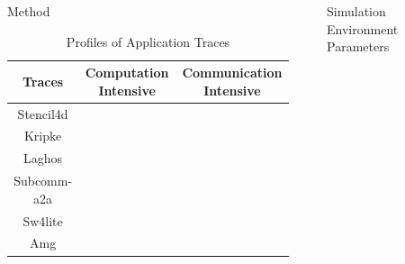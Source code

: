 \documentclass[final]{beamer}
\newcommand{\xmark}{\ding{55}}%
\newcommand{\CheckmarkBold}{\ding{51}}%
\newlength{\sepwidth}
\newcommand{\separatorcolumn}{\begin{column}{\sepwidth}\end{column}}
\begin{document}
\begin{frame}[t]
\begin{columns}[t]
\begin{column}{0.2\textwidth}
\begin{block}{Method}
\begin{itemize}
\begin{table}
        \begin{tabular}{|c|c|c|} \hline
        \hline
        \textbf{Traces} & \textbf{Computation Intensive} & \textbf{Communication Intensive} \\ \hline
        \cellcolor{Blue!10}Stencil4d & \cellcolor{Blue!10}\xmark & \cellcolor{Blue!10}\CheckmarkBold  \\    \hline
        Kripke & \CheckmarkBold & \xmark  \\    \hline
        \cellcolor{Blue!10}Laghos & \cellcolor{Blue!10}\CheckmarkBold & \cellcolor{Blue!10}\xmark  \\    \hline
        Subcomm-a2a & \xmark & \CheckmarkBold  \\    \hline
        \cellcolor{Blue!10}Sw4lite & \cellcolor{Blue!10}\CheckmarkBold  & \cellcolor{Blue!10}\CheckmarkBold  \\    \hline
        Amg & \CheckmarkBold  & \CheckmarkBold  \\    \hline
        \end{tabular}


\caption{Profiles of Application Traces}
\end{table}
        
        
    \end{itemize}



  \end{block}

\end{column}

\separatorcolumn

\begin{column}{0.5\textwidth}




  \begin{block}{Simulation Environment Parameters}
  \begin{column}{0.3\textwidth}


\end{column}
\end{block}
\end{column}
\end{columns}
\end{frame}
\end{document}
